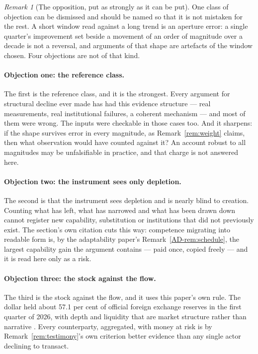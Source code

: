 \documentclass[11pt,a4paper]{article}
\theoremstyle{remark}
\newtheorem{remark}[definition]{Remark}
\begin{document}
\begin{remark}[The opposition, put as strongly as it can be put]\label{rem:steelman}
One class of objection can be dismissed and should be named so that it is not mistaken for the
rest. A short window read against a long trend is an aperture error: a single quarter's improvement set
beside a movement of an order of magnitude over a decade is not a reversal, and arguments of that shape
are artefacts of the window chosen. Four objections are not of that kind.

\paragraph{Objection one: the reference class.}
The first is the reference class, and it is the strongest. Every argument for structural decline
ever made has had this evidence structure --- real measurements, real institutional failures, a coherent
mechanism --- and most of them were wrong. The inputs were checkable in those cases too. And it
sharpens: if the shape survives error in every magnitude, as Remark~\ref{rem:weight} claims, then what
observation would have counted against it? An account robust to all magnitudes may be
unfalsifiable in practice, and that charge is not answered here.

\paragraph{Objection two: the instrument sees only depletion.}
The second is that the instrument sees depletion and is nearly blind to creation. Counting what
has left, what has narrowed and what has been drawn down cannot register new capability, substitution or
institutions that did not previously exist. The section's own citation cuts this way: competence
migrating into readable form is, by the adaptability paper's Remark~\ref{AD-rem:schedule}, the largest capability gain the argument
contains --- paid once, copied freely --- and it is read here only as a risk.

\paragraph{Objection three: the stock against the flow.}
The third is the stock against the flow, and it uses this paper's own rule. The dollar held about
57.1 per cent of official foreign exchange reserves in the first quarter of 2026, with depth and
liquidity that are market structure
rather than narrative \citep{cofer2026}. Every counterparty, aggregated, with money at risk is by
Remark~\ref{rem:testimony}'s own criterion better evidence than any single actor declining to transact.


\end{remark}
\end{document}
